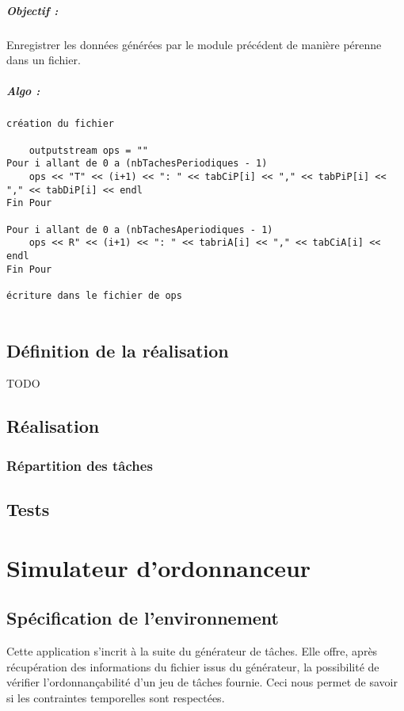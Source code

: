 		\paragraph{Objectif :} Enregistrer les données générées par le module précédent de manière pérenne dans un fichier.
		\paragraph{Algo :}
		\begin{verbatim}
création du fichier

	outputstream ops = ""
Pour i allant de 0 a (nbTachesPeriodiques - 1)		
	ops << "T" << (i+1) << ": " << tabCiP[i] << "," << tabPiP[i] << "," << tabDiP[i] << endl
Fin Pour

Pour i allant de 0 a (nbTachesAperiodiques - 1)
	ops << R" << (i+1) << ": " << tabriA[i] << "," << tabCiA[i] << endl
Fin Pour

écriture dans le fichier de ops
  
		\end{verbatim}

\section{Définition de la réalisation}
	\Huge
	TODO
	\normalsize

\section{Réalisation}
	\subsection{Répartition des tâches}

\section{Tests}



\chapter{Simulateur d'ordonnanceur}
	\section{Spécification de l’environnement}
		Cette application s'incrit à la suite du générateur de tâches. Elle offre, après récupération des informations du fichier issus du générateur, la possibilité de vérifier l'ordonnançabilité d'un jeu de tâches fournie. Ceci nous permet de savoir si les contraintes temporelles sont respectées. 

